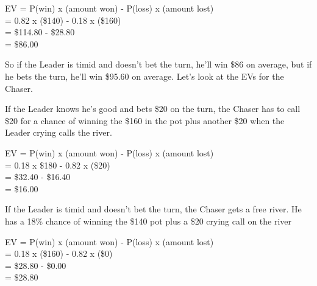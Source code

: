 EV = P(win) x (amount won) - P(loss) x (amount lost) \\
   = 0.82   x (\$140)      - 0.18    x (\$160) \\
   = \$114.80 - \$28.80 \\
   = \$86.00

So if the Leader is timid and doesn't bet the turn, he'll win \$86 on
average, but if he bets the turn, he'll win \$95.60 on average. Let's
look at the EVs for the Chaser.

If the Leader knows he's good and bets \$20 on the turn, the Chaser
has to call \$20 for a chance of winning the \$160 in the pot plus
another \$20 when the Leader crying calls the river.

EV = P(win) x (amount won) - P(loss) x (amount lost) \\
   = 0.18 x \$180 - 0.82 x (\$20) \\
   = \$32.40 - \$16.40 \\
   = \$16.00

If the Leader is timid and doesn't bet the turn, the Chaser gets a
free river. He has a 18\% chance of winning the \$140 pot plus a \$20
crying call on the river

EV = P(win) x (amount won) - P(loss) x (amount lost) \\
   = 0.18 x (\$160) - 0.82 x (\$0) \\
   = \$28.80 - \$0.00 \\
   = \$28.80
